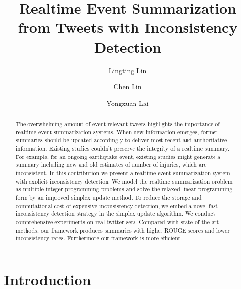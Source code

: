 \documentclass[runningheads]{llncs}
\begin{document}
\title{Realtime Event Summarization from Tweets with Inconsistency Detection}
\author{Lingting Lin \and Chen Lin \and Yongxuan Lai}

\maketitle
\begin{abstract}
The overwhelming amount of event relevant tweets highlights the importance of realtime event summarization systems. When new information emerges,  former summaries should be updated accordingly to deliver most recent and authoritative information. Existing studies couldn't preserve the integrity of a realtime summary.  For example, for an ongoing earthquake event, existing studies might generate a  summary including new and old estimates of number of injuries, which are inconsistent. In this contribution we present a realtime event summarization system with explicit inconsistency detection. We model the realtime summarization problem as multiple integer programming problems and solve the relaxed linear programming form by an improved simplex update method. To reduce the storage and computational cost of expensive inconsistency detection, we embed a novel fast inconsistency detection strategy in the  simplex update algorithm. We conduct comprehensive experiments on real twitter sets.  Compared with state-of-the-art methods, our framework produces  summaries with higher ROUGE scores and lower  inconsistency rates. Furthermore our framework is more efficient.
\end{abstract}


\section{Introduction}
\end{document}
